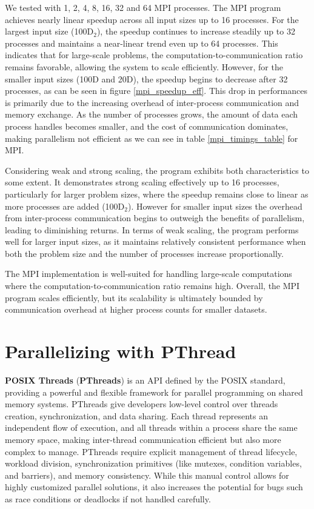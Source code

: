 \documentclass[11pt, journal]{IEEEtran}
\newcommand{\nwl}{

\vspace{11pt}

}
\begin{document}
We tested with 1, 2, 4, 8, 16, 32 and 64 MPI processes. The MPI program achieves nearly linear speedup across all input sizes up to 16 processes. For the largest input size (100D$_2$), the speedup continues to increase steadily up to 32 processes and maintains a near-linear trend even up to 64 processes. This indicates that for large-scale problems, the computation-to-communication ratio remains favorable, allowing the system to scale efficiently. However, for the smaller input sizes (100D and 20D), the speedup begins to decrease after 32 processes, as can be seen in figure \ref{mpi_speedup_eff}. This drop in performances is primarily due to the increasing overhead of inter-process communication and memory exchange. As the number of processes grows, the amount of data each process handles becomes smaller, and the cost of communication dominates, making parallelism not efficient as we can see in table \ref{mpi_timings_table} for MPI.
\nwl
Considering weak and strong scaling, the program exhibits both characteristics to some extent. It demonstrates strong scaling effectively up to 16 processes, particularly for larger problem sizes, where the speedup remains close to linear as more processes are added (100D$_2$). However for smaller input sizes the overhead from inter-process communication begins to outweigh the benefits of parallelism, leading to diminishing returns. In terms of weak scaling, the program performs well for larger input sizes, as it maintains relatively consistent performance when both the problem size and the number of processes increase proportionally. 
\nwl
The MPI implementation is well-suited for handling large-scale computations where the computation-to-communication ratio remains high. Overall, the MPI program scales efficiently, but its scalability is ultimately bounded by communication overhead at higher process counts for smaller datasets.


\section{Parallelizing with PThread}

\textbf{POSIX Threads} (\textbf{PThreads}) is an API defined by the POSIX standard, providing a powerful and flexible framework for parallel programming on shared memory systems. PThreads give developers low-level control over threads creation, synchronization, and data sharing. Each thread represents an independent flow of execution, and all threads within a process share the same memory space, making inter-thread communication efficient but also more complex to manage. PThreads require explicit management of thread lifecycle, workload division, synchronization primitives (like mutexes, condition variables, and barriers), and memory consistency. While this manual control allows for highly customized parallel solutions, it also increases the potential for bugs such as race conditions or deadlocks if not handled carefully.
\end{document}

